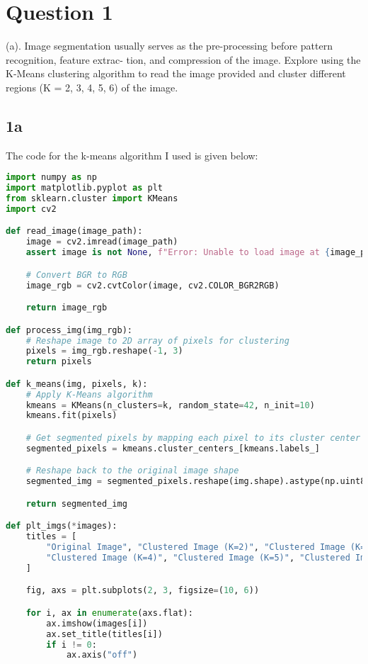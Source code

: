 \documentclass[12pt,letterpaper]{article}
\begin{document}
\sloppy

\section*{Question 1}
(a). Image segmentation usually serves as the pre-processing before pattern recognition, feature extrac-
tion, and compression of the image. Explore using the K-Means clustering algorithm to read the
image provided and cluster different regions (K = 2, 3, 4, 5, 6) of the image.
\vspace{-0.2in}
\subsection*{1a}
The code for the k-means algorithm I used is given below:
\begin{lstlisting}[language=Python, breaklines=true, columns=flexible, frame=single]
import numpy as np
import matplotlib.pyplot as plt
from sklearn.cluster import KMeans
import cv2

def read_image(image_path):
    image = cv2.imread(image_path)
    assert image is not None, f"Error: Unable to load image at {image_path}"

    # Convert BGR to RGB
    image_rgb = cv2.cvtColor(image, cv2.COLOR_BGR2RGB)

    return image_rgb

def process_img(img_rgb):
    # Reshape image to 2D array of pixels for clustering
    pixels = img_rgb.reshape(-1, 3)
    return pixels

def k_means(img, pixels, k):
    # Apply K-Means algorithm
    kmeans = KMeans(n_clusters=k, random_state=42, n_init=10)
    kmeans.fit(pixels)

    # Get segmented pixels by mapping each pixel to its cluster center
    segmented_pixels = kmeans.cluster_centers_[kmeans.labels_]

    # Reshape back to the original image shape
    segmented_img = segmented_pixels.reshape(img.shape).astype(np.uint8)

    return segmented_img

def plt_imgs(*images):
    titles = [
        "Original Image", "Clustered Image (K=2)", "Clustered Image (K=3)",
        "Clustered Image (K=4)", "Clustered Image (K=5)", "Clustered Image (K=6)"
    ]

    fig, axs = plt.subplots(2, 3, figsize=(10, 6))

    for i, ax in enumerate(axs.flat):
        ax.imshow(images[i])
        ax.set_title(titles[i])
        if i != 0:
            ax.axis("off")


\end{lstlisting}
\end{document}
